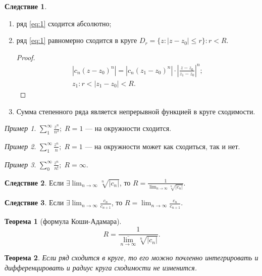 \documentclass[a4paper,12pt]{article}
\newtheorem*{theorem}{Теорема}
\theoremstyle{remark}
\newtheorem*{example}{Пример}
\theoremstyle{definition}
\newtheorem*{effect}{Следствие}
\begin{document}
\begin{effect} \(\)
    \begin{enumerate}
        \item ряд \eqref{eq:1} сходится абсолютно;
        \item ряд \eqref{eq:1} равномерно сходится в круге \(D_r = \{z: |z - z_0| \leqslant r\}: r < R\).
        \begin{proof}
            \begin{gather*}
                |c_n (z - z_0)^n| = |c_n (z_1 - z_0)^n| \cdot \left| \frac{z - z_0}{z_1 - z_0} \right|^n; \\
                z_1: r < |z_1 - z_0| < R.
            \end{gather*}
        \end{proof}
        \item Сумма степенного ряда является непрерывной функцией в круге сходимости.
    \end{enumerate}
\end{effect}

\begin{example}
    \(\sum_1^\infty \frac{z^n}{n^2};\; R = 1\) --- на окружности сходится.
\end{example}

\begin{example}
    \(\sum_1^\infty \frac{z^n}{n};\; R = 1\) --- на окружности может как сходиться, так и нет.
\end{example}

\begin{example}
    \(\sum_0^\infty \frac{z^n}{n!};\; R = \infty\).
\end{example}

\begin{effect}
    Если \(\exists \lim_{n \rightarrow \infty} \sqrt[n]{|c_n|}\), то \(R = \frac{1}{\lim_{n \rightarrow \infty} \sqrt[n]{|c_n|}}\).
\end{effect}

\begin{effect}
    Если \(\exists \lim_{n \rightarrow \infty} \frac{c_n}{c_{n+1}}\), то \(R = \lim_{n \rightarrow \infty} \frac{c_n}{c_{n+1}}\).
\end{effect}

\begin{theorem}[формула Коши-Адамара]
    \begin{equation*}
        R = \frac{1}{\overline{\lim_{n \rightarrow \infty}} \sqrt[n]{|c_n|}}.
    \end{equation*}
\end{theorem}

\begin{theorem}
    Если ряд сходится в круге, то его можно почленно интегрировать и дифференцировать и радиус круга сходимости не изменится.
\end{theorem}  
\end{document}
